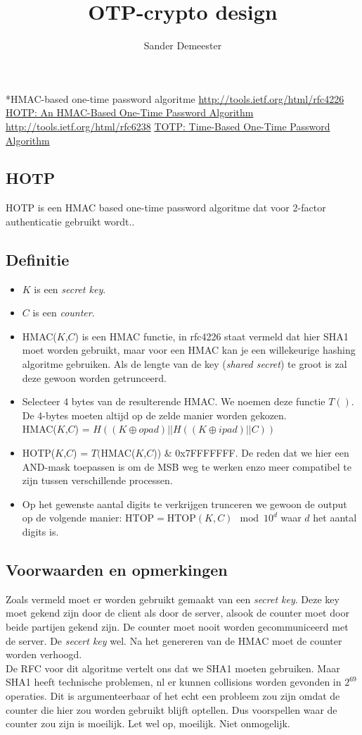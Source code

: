 \documentclass[10pt,a4paper]{report}
\author{Sander Demeester}
\title{OTP-crypto design}
\begin{document}
\begin{section}*{HMAC-based one-time password algoritme}
\url{http://tools.ietf.org/html/rfc4226}
\href{http://tools.ietf.org/html/rfc4226}{HOTP: An HMAC-Based One-Time Password Algorithm}\\
\url{http://tools.ietf.org/html/rfc6238}
\href{http://tools.ietf.org/html/rfc6238}{TOTP: Time-Based One-Time Password Algorithm}
\section*{HOTP}
HOTP is een HMAC based one-time password algoritme dat voor 2-factor authenticatie gebruikt wordt..\\

\subsection*{Definitie}
\begin{itemize}
\item $K$ is een \emph{secret key}.
\item $C$ is een \emph{counter}.
\item HMAC($K$,$C$) is een HMAC functie, in rfc4226 staat vermeld dat hier SHA1 moet worden gebruikt, maar voor een HMAC kan je een willekeurige hashing algoritme gebruiken. Als de lengte van de key (\emph{shared secret}) te groot is zal deze gewoon worden getrunceerd.
\item Selecteer 4 bytes van de resulterende HMAC. We noemen deze functie $T()$. De 4-bytes moeten altijd op de zelde manier worden gekozen.\\
HMAC($K$,$C$) = $H((K \oplus opad) || H((K \oplus ipad) || C))$
\item HOTP($K$,$C$) = $T($HMAC($K$,$C$)) \& 0x7FFFFFFF. De reden dat we hier een AND-mask toepassen is om de MSB weg te werken enzo meer compatibel te zijn tussen verschillende processen.
\item Op het gewenste aantal digits te verkrijgen trunceren we gewoon de output op de volgende manier:
$\text{HTOP} = \text{HTOP}(K,C) \mod 10^d$ waar $d$ het aantal digits is. 
\end{itemize}
\subsection*{Voorwaarden en opmerkingen}
Zoals vermeld moet er worden gebruikt gemaakt van een \emph{secret key}. Deze key moet gekend zijn door de client als door de server, alsook de counter moet door beide partijen gekend zijn. De counter moet nooit worden gecommuniceerd met de server. De \emph{secert key} wel. Na het genereren van de HMAC moet de counter worden verhoogd.\\
De RFC voor dit algoritme vertelt ons dat we SHA1 moeten gebruiken. Maar SHA1 heeft technische problemen, nl er kunnen collisions worden gevonden in $2^69$ operaties. Dit is argumenteerbaar of het echt een probleem zou zijn omdat de counter die hier zou worden gebruikt blijft optellen. Dus voorspellen waar de counter zou zijn is moeilijk. Let wel op, moeilijk. Niet onmogelijk. 

\end{section}
\end{document}
